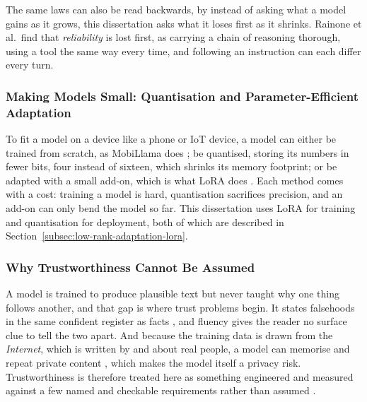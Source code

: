 The same laws can also be read backwards, by instead of asking what a model gains as it grows, this dissertation asks what it loses first as it shrinks. Rainone et al.\ find that \emph{reliability} is lost first, as carrying a chain of reasoning thorough, using a tool the same way every time, and following an instruction \cite{rainone2025replacingthinkingtoolusage} can each differ every turn.

\subsubsection{Making Models Small: Quantisation and Parameter-Efficient Adaptation}
\label{subsec:making-models-small}

To fit a model on a device like a phone or IoT device, a model can either be trained from scratch, as MobiLlama does \cite{thawakar2024mobillamaaccuratelightweightfully}; be quantised, storing its numbers in fewer bits, four instead of sixteen, which shrinks its memory footprint; or be adapted with a small add-on, which is what LoRA does \cite{hu2021loralowrankadaptationlarge}. Each method comes with a cost: training a model is hard, quantisation sacrifices precision, and an add-on can only bend the model so far. This dissertation uses LoRA for training and quantisation for deployment, both of which are described in Section~\ref{subsec:low-rank-adaptation-lora}.

\subsubsection{Why Trustworthiness Cannot Be Assumed}
\label{subsec:why-trustworthiness}

A model is trained to produce plausible text but never taught why one thing follows another, and that gap is where trust problems begin. It states falsehoods in the same confident register as facts \cite{ji2024surveyhallucinationnaturallanguage}, and fluency gives the reader no surface clue to tell the two apart. And because the training data is drawn from the \emph{Internet}, which is written by and about real people, a model can memorise and repeat private content \cite{carlini2021extractingtrainingdatalarge, shokri2017membershipinferenceattacksmachine}, which makes the model itself a privacy risk. Trustworthiness is therefore treated here as something engineered and measured against a few named and checkable requirements rather than assumed \cite{huang2024trustllmtrustworthinesslargelanguage, euhleg2019}.

